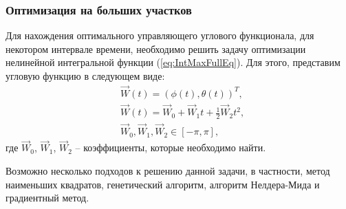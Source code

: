 \subsubsection{Оптимизация на больших участков}
\noindent\indent Для нахождения оптимального управляющего углового функционала,
для некотором интервале времени, необходимо решить задачу оптимизации нелинейной
интегральной функции (\ref{eq:IntMaxFullEq}). Для этого, представим угловую функцию
в следующем виде:
\begin{equation}
  \begin{aligned}
    & \vec{W}(t) = (\phi(t), \theta(t))^T, \\
    & \vec{W}(t) = \vec{W}_0 + \vec{W}_1 t + \frac{1}{2}\vec{W}_2 t^2, \\
    & \vec{W}_0, \vec{W}_1, \vec{W}_2 \in [-\pi, \pi],
  \end{aligned}
\end{equation}
где $\vec{W}_0$, $\vec{W}_1$, $\vec{W}_2$ -- коэффициенты, которые необходимо найти.\par
  Возможно несколько подходов к решению данной задачи, в частности, метод наименьших
квадратов, генетический алгоритм, алгоритм Нелдера-Мида и градиентный метод.
